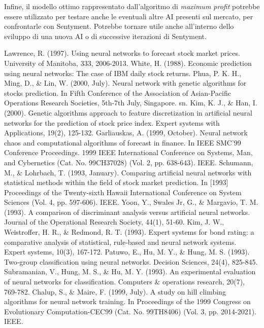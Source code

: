\documentclass[a4paper,12pt]{report}
\begin{document}
\begin{fig}
Infine, il modello ottimo rappresentato dall'algoritmo di \textit{maximum profit} potrebbe essere utilizzato per testare anche le eventuali altre AI presenti sul mercato, per confrontarle con Sentyment. Potrebbe tornare utile anche all'interno dello sviluppo di una nuova AI o di successive iterazioni di Sentyment.

\newpage

%
%
\begin{thebibliography}{9}
	Lawrence, R. (1997). Using neural networks to forecast stock market prices. University of Manitoba, 333, 2006-2013.
	White, H. (1988). Economic prediction using neural networks: The case of IBM daily stock returns.
	Phua, P. K. H., Ming, D., \& Lin, W. (2000, July). Neural network with genetic algorithms for stocks prediction. In Fifth Conference of the Association of Asian-Pacific Operations Research Societies, 5th-7th July, Singapore. sn.
	Kim, K. J., \& Han, I. (2000). Genetic algorithms approach to feature discretization in artificial neural networks for the prediction of stock price index. Expert systems with Applications, 19(2), 125-132.
	Garliauskas, A. (1999, October). Neural network chaos and computational algorithms of forecast in finance. In IEEE SMC'99 Conference Proceedings. 1999 IEEE International Conference on Systems, Man, and Cybernetics (Cat. No. 99CH37028) (Vol. 2, pp. 638-643). IEEE.
	Schumann, M., \& Lohrbach, T. (1993, January). Comparing artificial neural networks with statistical methods within the field of stock market prediction. In [1993] Proceedings of the Twenty-sixth Hawaii International Conference on System Sciences (Vol. 4, pp. 597-606). IEEE.
	Yoon, Y., Swales Jr, G., \& Margavio, T. M. (1993). A comparison of discriminant analysis versus artificial neural networks. Journal of the Operational Research Society, 44(1), 51-60.
	Kim, J. W., Weistroffer, H. R., \& Redmond, R. T. (1993). Expert systems for bond rating: a comparative analysis of statistical, rule‐based and neural network systems. Expert systems, 10(3), 167-172.
	Patuwo, E., Hu, M. Y., \& Hung, M. S. (1993). Two‐group classification using neural networks. Decision Sciences, 24(4), 825-845.
	Subramanian, V., Hung, M. S., \& Hu, M. Y. (1993). An experimental evaluation of neural networks for classification. Computers \& operations research, 20(7), 769-782.
	Chalup, S., \& Maire, F. (1999, July). A study on hill climbing algorithms for neural network training. In Proceedings of the 1999 Congress on Evolutionary Computation-CEC99 (Cat. No. 99TH8406) (Vol. 3, pp. 2014-2021). IEEE.

\end{thebibliography}
\end{fig}
\end{document}

